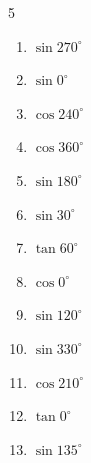 \begin{multicols}{5}
\begin{enumerate}
  \item $\displaystyle \sin{270^\circ}$

        \phantom{$\displaystyle =-1$}

  \item $\displaystyle \sin{0^\circ}$

        \phantom{$\displaystyle =0$}

  \item $\displaystyle \cos{240^\circ}$


  \item $\displaystyle \cos{360^\circ}$

        \phantom{$\displaystyle =1$}

  \item $\displaystyle \sin{180^\circ}$

        \phantom{$\displaystyle =0$}

\columnbreak %

  \item $\displaystyle \sin{30^\circ}$


  \item $\displaystyle \tan{60^\circ}$


  \item $\displaystyle \cos{0^\circ}$

        \phantom{$\displaystyle =1$}

  \item $\displaystyle \sin{120^\circ}$


  \item $\displaystyle \sin{330^\circ}$


  \item $\displaystyle \cos{210^\circ}$


  \item $\displaystyle \tan{0^\circ}$

        \phantom{$\displaystyle =0$}

  \item $\displaystyle \sin{135^\circ}$


\end{enumerate}
\end{multicols}
